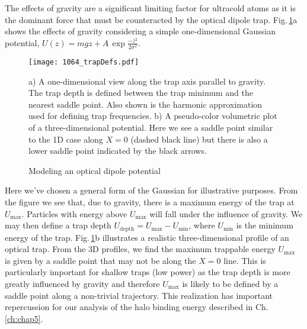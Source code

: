 The effects of gravity are a significant limiting factor for ultracold atoms as it is the dominant force that must be counteracted by the optical dipole trap.
Fig.\,\ref{fig:trapDepth}a shows the effects of gravity considering a simple one-dimensional Gaussian potential, $U(z) = mgz + A\,\exp{\frac{-z^2}{2\sigma^2}}$.
	\begin{figure} 
		\centerline{
		\texttt{[image: 1064\_trapDefs.pdf]}}
		\caption{Modeling an optical dipole potential}{a) A one-dimensional view along the trap axis parallel to gravity. The trap depth is defined between the trap minimum and the nearest saddle point. Also shown is the harmonic approximation used for defining trap frequencies. b) A pseudo-color volumetric plot of a three-dimensional potential. Here we see a saddle point similar to the 1D case along $X=0$ (dashed black line) but there is also a lower saddle point indicated by the black arrows.}
		\label{fig:trapDepth}
	\end{figure}
Here we've chosen a general form of the Gaussian for illustrative purposes.
From the figure we see that, due to gravity, there is a maximum energy of the trap at $U_{\text{max}}$.
Particles with energy above $U_{\text{max}}$ will fall under the influence of gravity.
We may then define a trap depth $U_{\text{depth}} = U_{\text{max}} - U_{\text{min}}$, where $U_{\text{min}}$ is the minimum energy of the trap.
Fig.\,\ref{fig:trapDepth}b illustrates a realistic three-dimensional profile of an optical trap.
From the 3D profiles, we find the maximum trappable energy $U_{\text{max}}$ is given by a saddle point that may not be along the $X=0$ line.
This is particularly important for shallow traps (low power) as the trap depth is more greatly influenced by gravity and therefore $U_{\text{max}}$ is likely to be defined by a saddle point along a non-trivial trajectory.
This realization has important repercussion for our analysis of the halo binding energy described in Ch.\,\ref{ch:chap5}.


